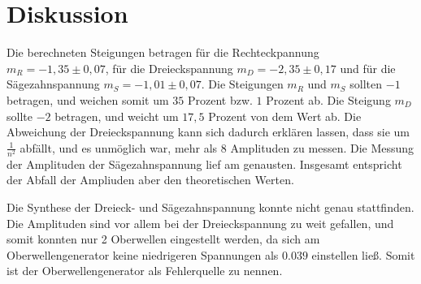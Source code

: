 \section{Diskussion}
\label{sec:Diskussion}

Die berechneten Steigungen betragen für die Rechteckpannung $m_R = -1,35 \pm 0,07$, für die
Dreieckspannung $m_D= -2,35 \pm 0,17$ und für die Sägezahnspannung $m_S= -1,01 \pm 0,07$. 
Die Steigungen $m_R$ und $m_S$ sollten $-1$ betragen, und weichen somit um $35$ Prozent bzw. $1$ Prozent ab. 
Die Steigung $m_D$ sollte $-2$ betragen, und weicht um $17,5$ Prozent von dem Wert ab. Die Abweichung 
der Dreieckspannung kann sich dadurch erklären lassen, dass sie um $\frac{1}{n^2}$ abfällt, und es unmöglich war, mehr als 8 Amplituden zu messen.
Die Messung der Amplituden der Sägezahnspannung lief am genausten. 
Insgesamt entspricht der Abfall der Ampliuden aber den theoretischen Werten.

\noindent Die Synthese der Dreieck- und Sägezahnspannung konnte nicht genau stattfinden. 
Die Amplituden sind vor allem bei der Dreieckspannung zu weit gefallen, und somit konnten nur 2 Oberwellen eingestellt werden, da sich am Oberwellengenerator keine niedrigeren Spannungen als
$0.039$ einstellen ließ.
Somit ist der Oberwellengenerator als Fehlerquelle zu nennen.